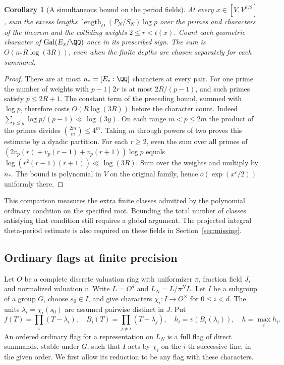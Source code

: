 \documentclass[a4paper,11pt]{article}
\newtheorem{corollary}[proposition]{Corollary}
\theoremstyle{definition}
\theoremstyle{remark}
\numberwithin{equation}{section}
\begin{document}
\begin{corollary}[A simultaneous bound on the period fields]
\leavevmode\label{cor:collisionloss545}
At every \(x\in[V,V^{3/2}]\), sum the excess lengths
\(\operatorname{length}_O(P_N/S_N)\log p\) over the primes
and characters of the theorem and the colliding weights
\(2\le r<t(x)\). Count each geometric character of
\(\operatorname{Gal}(E_x/\QQ)\) once in its prescribed sign.
The sum is \(O(n_*R\log(3R))\), even when the finite depths
are chosen separately for each summand.
\end{corollary}
\begin{proof}
There are at most \(n_*=[E_*:\QQ]\) characters at every pair.
For one prime the number of weights with \(p-1\mid2r\) is at
most \(2R/(p-1)\), and such primes satisfy \(p\le2R+1\).
The constant term of the preceding bound, summed with \(\log p\),
therefore costs \(O(R\log(3R))\) before the character count.
Indeed \(\sum_{p\le y}\log p/(p-1)\ll\log(3y)\). On each
range \(m<p\le2m\) the product of the primes divides
\(\binom{2m}{m}\le4^m\). Taking \(m\) through powers of two
proves this estimate by a dyadic partition. For each \(r\ge2\),
even the sum over all primes of
\((2v_p(r)+v_p(r-1)+v_p(r+1))\log p\) equals
\(\log(r^2(r-1)(r+1))\ll\log(3R)\). Sum over the weights
and multiply by \(n_*\). The bound is polynomial in \(V\)
on the original family, hence \(o(\exp(x^\varepsilon/2))\)
uniformly there.
\end{proof}

This comparison measures the extra finite classes admitted by
the polynomial ordinary condition on the specified root.
Bounding the total number of classes satisfying that condition
still requires a global argument. The projected integral
theta-period estimate is also required on these fields in
Section~\ref{sec:missing}.


\subsection{Ordinary flags at finite precision}
\label{sec:finiteflag546}

Let \(O\) be a complete discrete valuation ring with uniformizer
\(\pi\), fraction field \(J\), and normalized valuation \(v\).
Write \(L=O^d\) and \(L_N=L/\pi^N L\).
Let \(I\) be a subgroup of a group \(G\), choose \(s_0\in I\),
and give characters \(\chi_i:I\to O^\times\) for \(0\le i<d\).
The units \(\lambda_i=\chi_i(s_0)\) are assumed pairwise
distinct in \(J\). Put
\[
    f(T)=\prod_i(T-\lambda_i),\quad
    B_i(T)=\prod_{j\ne i}(T-\lambda_j),\quad
    h_i=v(B_i(\lambda_i)),\quad h=\max_i h_i .
\]
An ordered ordinary flag for a representation on \(L_N\)
is a full flag of direct summands, stable under \(G\),
such that \(I\) acts by \(\chi_i\) on the \(i\)-th successive
line, in the given order. We first allow its reduction
to be any flag with these characters.
\end{document}
